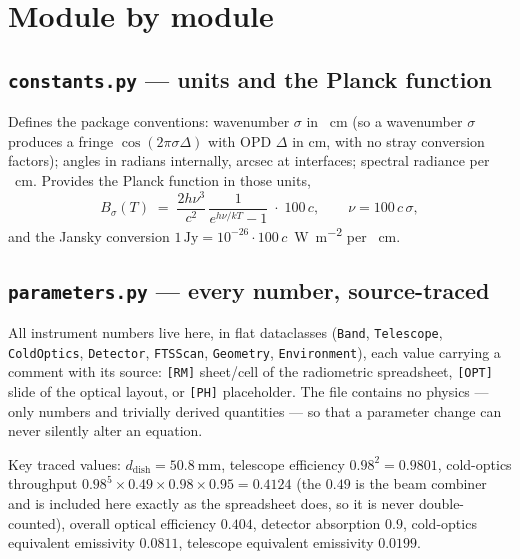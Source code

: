 \documentclass[11pt]{article}
\newcommand{\code}[1]{\texttt{\small #1}}
\newcommand{\file}[1]{\textcolor{plumdark}{\texttt{\small #1}}}
\begin{document}
\section{Module by module}

\subsection{\file{constants.py} --- units and the Planck function}

Defines the package conventions: wavenumber $\sigma$ in \si{\per\centi\metre}
(so a wavenumber $\sigma$ produces a fringe $\cos(2\pi\sigma\Delta)$ with OPD
$\Delta$ in \si{\centi\metre}, with no stray conversion factors); angles in
radians internally, arcsec at interfaces; spectral radiance per
\si{\per\centi\metre}. Provides the Planck function in those units,
\begin{equation}
B_\sigma(T) \;=\; \frac{2 h \nu^3}{c^2}\,
\frac{1}{e^{h\nu/kT}-1}\;\cdot\;100\,c,
\qquad \nu = 100\,c\,\sigma,
\end{equation}
and the Jansky conversion $1\,\mathrm{Jy} = 10^{-26}\cdot 100\,c$
\,\si{\watt\per\square\metre} per \si{\per\centi\metre}.

\subsection{\file{parameters.py} --- every number, source-traced}

All instrument numbers live here, in flat dataclasses (\code{Band},
\code{Telescope}, \code{ColdOptics}, \code{Detector}, \code{FTSScan},
\code{Geometry}, \code{Environment}), each value carrying a comment with its
source: \code{[RM]} sheet/cell of the radiometric spreadsheet, \code{[OPT]}
slide of the optical layout, or \code{[PH]} placeholder. The file contains no
physics --- only numbers and trivially derived quantities --- so that a
parameter change can never silently alter an equation.

Key traced values: $d_\mathrm{dish}=\SI{50.8}{\milli\metre}$, telescope
efficiency $0.98^2 = 0.9801$, cold-optics throughput
$0.98^5 \times 0.49 \times 0.98 \times 0.95 = 0.4124$ (the $0.49$ is the beam
combiner and is included here exactly as the spreadsheet does, so it is never
double-counted), overall optical efficiency $0.404$, detector absorption
$0.9$, cold-optics equivalent emissivity $0.0811$, telescope equivalent
emissivity $0.0199$.
\end{document}
